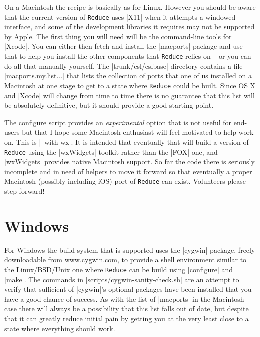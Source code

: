 \documentclass[12pt,twoside,openright]{memoir}
\newcommand{\reduce}{\texttt{Reduce}\xspace}
\begin{document}
On a Macintosh the recipe is basically as for Linux. However you should be
aware that the current version of \reduce uses |X11| when it attempts a
windowed interface, and some of the development libraries it requires may not
be supported by Apple. The first thing you will need will be the command-line
tools for |Xcode|. You can either then fetch and install the |macports| package
and use that to help you install the other components that \reduce relies on --
or you can do all that manually yourself. The |trunk/csl/cslbase| directory
contains a file |macports.my.list...| that lists the collection of
ports that one of us installed on a Macintosh at one stage to get to a state
where \reduce could be built. Since OS X and |Xcode| will change from time to
time there is no guarantee that this list will be absolutely definitive, but
it should provide a good starting point.

The configure script provides an {\em experimental} option that is not useful
for end-users but that I hope some Macintosh enthusiast will feel motivated to
help work on. This is |--with-wx|. It is intended that eventually that will
build a version of \reduce using the |wxWidgets| toolkit rather than the |FOX|
one, and |wxWidgets| provides native Macintosh support. So far the code there
is seriously incomplete and in need of helpers to move it forward so that
eventually a proper Macintosh (possibly including iOS) port of \reduce can
exist. Volunteers please step forward!

\section{Windows}

For Windows the build system that is supported uses the |cygwin| package,
freely downloadable from \url{www.cygwin.com}, to provide a shell environment
similar to the Linux/BSD/Unix one where \reduce can be build using |configure|
and |make|. The commands in |scripts/cygwin-sanity-check.sh| are an attempt to
verify that sufficient of |cygwin|'s optional packages have been installed that
you have a good chance of success. As with the list of |macports| in the
Macintosh case there will always be a possibility that this list falls
out of date, but despite that it can greatly reduce initial pain by getting
you at the very least close to a state where everything should work.
\end{document}
